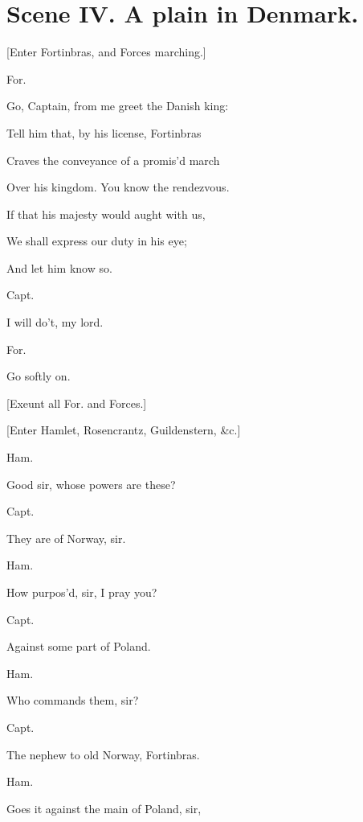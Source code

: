 \documentclass[12pt]{book}
\begin{document}
\section*{Scene IV. A plain in Denmark.}



[Enter Fortinbras, and Forces marching.]



For.

Go, Captain, from me greet the Danish king:

Tell him that, by his license, Fortinbras

Craves the conveyance of a promis'd march

Over his kingdom. You know the rendezvous.

If that his majesty would aught with us,

We shall express our duty in his eye;

And let him know so.



Capt.

I will do't, my lord.



For.

Go softly on.



[Exeunt all For. and Forces.]



[Enter Hamlet, Rosencrantz, Guildenstern, \&c.]



Ham.

Good sir, whose powers are these?



Capt.

They are of Norway, sir.



Ham.

How purpos'd, sir, I pray you?



Capt.

Against some part of Poland.



Ham.

Who commands them, sir?



Capt.

The nephew to old Norway, Fortinbras.



Ham.

Goes it against the main of Poland, sir,
\end{document}

